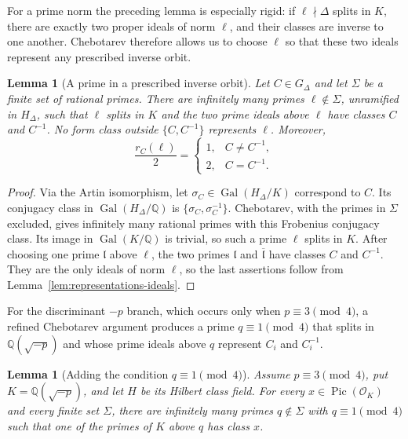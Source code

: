 \documentclass[11pt]{amsart}
\newtheorem{lemma}[theorem]{Lemma}
\theoremstyle{definition}
\theoremstyle{remark}
\newcommand{\Q}{\mathbb{Q}}
\newcommand{\OO}{\mathcal{O}}
\newcommand{\Pic}{\operatorname{Pic}}
\newcommand{\Gal}{\operatorname{Gal}}
\begin{document}
For a prime norm the preceding lemma is especially rigid: if
$\ell\nmid\Delta$ splits in $K$, there are exactly two proper ideals of
norm $\ell$, and their classes are inverse to one another. Chebotarev
therefore allows us to choose $\ell$ so that these two ideals represent
any prescribed inverse orbit.

\begin{lemma}[A prime in a prescribed inverse orbit]\label{lem:prime-isolation}
Let $C\in G_\Delta$ and let $\Sigma$ be a finite set of rational primes.  There are infinitely many primes $\ell\notin\Sigma$, unramified in $H_\Delta$, such that $\ell$ splits in $K$ and the two prime ideals above $\ell$ have classes $C$ and $C^{-1}$.  No form class outside $\{C,C^{-1}\}$ represents $\ell$.  Moreover,
\[
  \frac{r_C(\ell)}2=
  \begin{cases}
    1,&C\ne C^{-1},\\
    2,&C=C^{-1}.
  \end{cases}
\]
\end{lemma}

\begin{proof}
Via the Artin isomorphism, let $\sigma_C\in\Gal(H_\Delta/K)$ correspond to $C$.  Its conjugacy class in $\Gal(H_\Delta/\Q)$ is $\{\sigma_C,\sigma_C^{-1}\}$.  Chebotarev, with the primes in $\Sigma$ excluded, gives infinitely many rational primes with this Frobenius conjugacy class.  Its image in $\Gal(K/\Q)$ is trivial, so such a prime $\ell$ splits in $K$.  After choosing one prime $\mathfrak l$ above $\ell$, the two primes $\mathfrak l$ and $\overline{\mathfrak l}$ have classes $C$ and $C^{-1}$.  They are the only ideals of norm $\ell$, so the last assertions follow from Lemma~\ref{lem:representations-ideals}.
\end{proof}

For the discriminant $-p$ branch, which occurs only when
$p\equiv3\pmod4$, a refined Chebotarev argument produces a prime
$q\equiv1\pmod4$ that splits in $\Q(\sqrt{-p})$ and whose prime ideals
above $q$ represent $C_i$ and $C_i^{-1}$.

\begin{lemma}[Adding the condition $q\equiv1\pmod4$]\label{lem:class-mod-four}
Assume $p\equiv3\pmod4$, put $K=\Q(\sqrt{-p})$, and let $H$ be its Hilbert class field. For every $x\in\Pic(\OO_K)$ and every finite set $\Sigma$, there are infinitely many primes $q\notin\Sigma$ with $q\equiv1\pmod4$ such that one of the primes of $K$ above $q$ has class $x$.
\end{lemma}
\end{document}
